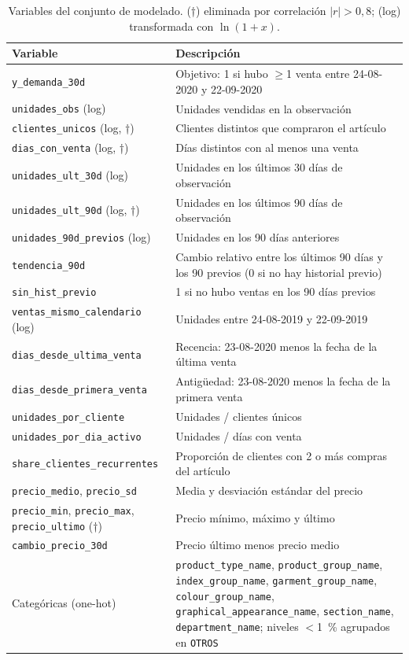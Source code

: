 \documentclass[
  journal=largetwo,
  manuscript=Laboratorio-Numero-02,
  year=2026,
  volume=1
]{cup-journal}
\begin{document}
\begin{table}[!ht]
\centering\footnotesize\renewcommand{\arraystretch}{0.92}
\caption{Variables del conjunto de modelado. (†) eliminada por correlación $|r|>0{,}8$; (log) transformada con $\ln(1+x)$.}
\label{tab:variables}
\begin{tabular}{@{}lp{}@{}}
\toprule
Variable & Descripción \\
\midrule
\texttt{y\_demanda\_30d} & Objetivo: 1 si hubo $\ge$1 venta entre 24-08-2020 y 22-09-2020 \\
\texttt{unidades\_obs} (log) & Unidades vendidas en la observación \\
\texttt{clientes\_unicos} (log, †) & Clientes distintos que compraron el artículo \\
\texttt{dias\_con\_venta} (log, †) & Días distintos con al menos una venta \\
\texttt{unidades\_ult\_30d} (log) & Unidades en los últimos 30 días de observación \\
\texttt{unidades\_ult\_90d} (log, †) & Unidades en los últimos 90 días de observación \\
\texttt{unidades\_90d\_previos} (log) & Unidades en los 90 días anteriores \\
\texttt{tendencia\_90d} & Cambio relativo entre los últimos 90 días y los 90 previos (0 si no hay historial previo) \\
\texttt{sin\_hist\_previo} & 1 si no hubo ventas en los 90 días previos \\
\texttt{ventas\_mismo\_calendario} (log) & Unidades entre 24-08-2019 y 22-09-2019 \\
\texttt{dias\_desde\_ultima\_venta} & Recencia: 23-08-2020 menos la fecha de la última venta \\
\texttt{dias\_desde\_primera\_venta} & Antigüedad: 23-08-2020 menos la fecha de la primera venta \\
\texttt{unidades\_por\_cliente} & Unidades / clientes únicos \\
\texttt{unidades\_por\_dia\_activo} & Unidades / días con venta \\
\texttt{share\_clientes\_recurrentes} & Proporción de clientes con 2 o más compras del artículo \\
\texttt{precio\_medio}, \texttt{precio\_sd} & Media y desviación estándar del precio \\
\texttt{precio\_min}, \texttt{precio\_max}, \texttt{precio\_ultimo} (†) & Precio mínimo, máximo y último \\
\texttt{cambio\_precio\_30d} & Precio último menos precio medio \\
Categóricas (one-hot) & \texttt{product\_type\_name}, \texttt{product\_group\_name}, \texttt{index\_group\_name}, \texttt{garment\_group\_name}, \texttt{colour\_group\_name}, \texttt{graphical\_appearance\_name}, \texttt{section\_name}, \texttt{department\_name}; niveles $<$1~\% agrupados en \texttt{OTROS} \\
\bottomrule
\end{tabular}
\end{table}
\end{document}
